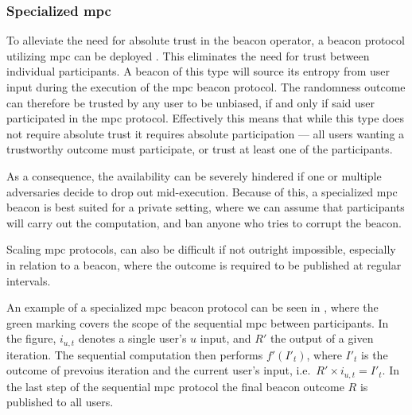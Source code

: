 \subsubsection{Specialized \gls{mpc}}\label{ssub:specialized_mpc}
To alleviate the need for absolute trust in the beacon operator, a beacon protocol utilizing \acrfull{mpc} can be deployed .
This eliminates the need for trust between individual participants.
A beacon of this type will source its entropy from user input during the execution of the \gls{mpc} beacon protocol.
The randomness outcome can therefore be trusted by any user to be unbiased, if and only if said user participated in the \gls{mpc} protocol.
Effectively this means that while this type does not require absolute trust it requires absolute participation --- all users wanting a trustworthy outcome must participate, or trust at least one of the participants.

As a consequence, the availability can be severely hindered if one or multiple adversaries decide to drop out mid-execution.
Because of this, a specialized \gls{mpc} beacon is best suited for a private setting, where we can assume that participants will carry out the computation, and ban anyone who tries to corrupt the beacon.

Scaling \gls{mpc} protocols, can also be difficult if not outright impossible, especially in relation to a beacon, where the outcome is required to be published at regular intervals.

An example of a specialized \gls{mpc} beacon protocol can be seen in , where the green marking covers the scope of the sequential \gls{mpc} between participants.
In the figure, $i_{u,t}$ denotes a single user's $u$ input, and $R'$ the output of a given iteration.
The sequential computation then performs $f'(I'_t)$, where $I'_t$ is the outcome of prevoius iteration and the current user's input, i.e.\ $R' \times i_{u,t} = I'_t$.
In the last step of the sequential \gls{mpc} protocol the final beacon outcome $R$ is published to all users.

